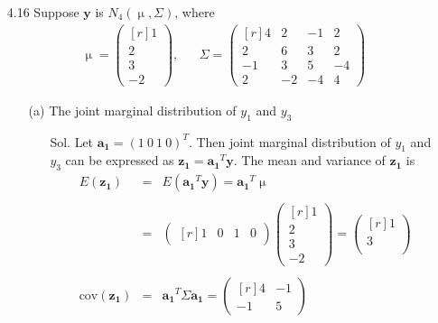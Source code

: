 \documentclass[12pt]{article} %
\begin{document}
\begin{enumerate}
\item[4.16]  Suppose $\mathbf{y}$ is $N_{4}(\upmu, \Sigma)$, where
	\begin{eqnarray*}
		\upmu=
		\begin{pmatrix}[r]
			 1\\
			 2\\
			 3\\
			-2
		\end{pmatrix},&&
		\Sigma=
		\begin{pmatrix}[r]
			 4& 2& -1& 2\\
			 2& 6& 3& 2\\
		   	-1& 3& 5& -4\\
		     2&-2&-4& 4  
		\end{pmatrix}
	\end{eqnarray*}
		\begin{enumerate}
		\item[(a)] The joint marginal distribution of $y_{1}$ and $y_{3}$
			\begin{enumerate}
				\item[Sol.] Let $\mathbf{a_{1}}=(1~0~1~0)^{T}$. Then joint
				marginal distribution of $y_{1}$ and $y_{3}$ can be expressed as 
				$\mathbf{z_{1}}=\mathbf{a_{1}}^{T}\mathbf{y}$. 
				The mean and variance of $\mathbf{z_{1}}$ is
				\begin{eqnarray*}
					E(\mathbf{z_{1}})&=&E(\mathbf{a_{1}}^{T}\mathbf{y})=\mathbf{a_{1}}^{T}\upmu\\
					\\
					&=&
					\begin{pmatrix}[r]
						1 & 0 & 1 & 0
					\end{pmatrix}
					\begin{pmatrix}[r]
						 1\\
						 2\\
						 3\\
						-2				
					\end{pmatrix}
					=
					\begin{pmatrix}[r]
						1 \\
						3 \\
					\end{pmatrix}\\
					\\
					\mathrm{cov}(\mathbf{z_{1}})&=&\mathbf{a_{1}}^{T} \Sigma \mathbf{a_{1}}=
					\begin{pmatrix}[r]
						 4 & -1 \\
					   -1 &  5
					\end{pmatrix}\\				

\end{eqnarray*}
\end{enumerate}
\end{enumerate}
\end{enumerate}
\end{document}
